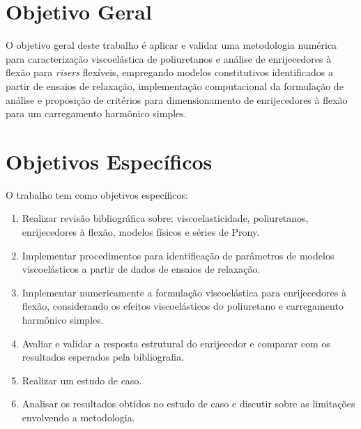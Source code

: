 \documentclass[arial,centeredequations,english,brazilian,oneside,section=TITLE]{ifes8}
\begin{document}
\section{Objetivo Geral}
\label{sec:objetivo-geral}

O objetivo geral deste trabalho é aplicar e validar uma metodologia numérica
para caracterização viscoelástica de poliuretanos e análise de enrijecedores à
flexão para \emph{risers} flexíveis, empregando modelos constitutivos identificados a 
partir de ensaios de relaxação, implementação computacional da formulação de análise e 
proposição de critérios para dimensionamento de  enrijecedores à flexão para um 
carregamento harmônico simples.

\section{Objetivos Específicos}
\label{sec:objetivos-especificos}

O trabalho tem como objetivos específicos:

\begin{enumerate}
  \item Realizar revisão bibliográfica sobre: viscoelasticidade, poliuretanos, 
enrijecedores à flexão, modelos físicos e séries de Prony.
  \item Implementar procedimentos para identificação de parâmetros de modelos 
viscoelásticos a partir de dados de ensaios de relaxação.
  \item Implementar numericamente a formulação viscoelástica para enrijecedores à flexão, 
  considerando os efeitos viscoelásticos do poliuretano e carregamento harmônico simples.
  \item Avaliar e validar a resposta estrutural do enrijecedor e comparar com os resultados 
  esperados pela bibliografia.
  \item Realizar um estudo de caso.
  \item Analisar os resultados obtidos no estudo de caso e discutir sobre as limitações 
  envolvendo a metodologia.

\end{enumerate}
\end{document}

